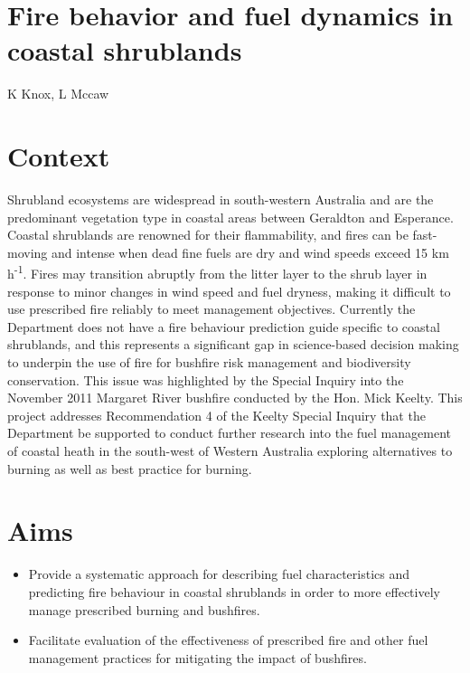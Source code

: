 \documentclass[version=last,
    paper=a4, %
    10pt, %
    usenames,
    dvipsnames,
    oneside, %
    headings=openany, %
    DIV=15 %
]{scrbook}
\begin{document}
\section*{Fire behavior and fuel dynamics in coastal shrublands
}

K Knox, L Mccaw


\section*{Context}
Shrubland ecosystems are widespread in south-western Australia and are
the predominant vegetation type in coastal areas between Geraldton and
Esperance. Coastal shrublands are renowned for their flammability, and
fires can be fast-moving and intense when dead fine fuels are dry and
wind speeds exceed 15 km h\textsuperscript{-1}. Fires may transition
abruptly from the litter layer to the shrub layer in response to minor
changes in wind speed and fuel dryness, making it difficult to use
prescribed fire reliably to meet management objectives. Currently the
Department does not have a fire behaviour prediction guide specific to
coastal shrublands, and this represents a significant gap in
science-based decision making to underpin the use of fire for bushfire
risk management and biodiversity conservation. This issue was
highlighted by the Special Inquiry into the November 2011 Margaret River
bushfire conducted by the Hon. Mick Keelty. This project addresses
Recommendation 4 of the Keelty Special Inquiry that the Department be
supported to conduct further research into the fuel management of
coastal heath in the south-west of Western Australia exploring
alternatives to burning as well as best practice for burning.



\section*{Aims}
\begin{itemize}
\itemsep1pt\parskip0pt
\item
  Provide a systematic approach for describing fuel characteristics and
  predicting fire behaviour in coastal shrublands in order to more
  effectively manage prescribed burning and bushfires.
\item
  Facilitate evaluation of the effectiveness of prescribed fire and
  other fuel management practices for mitigating the impact of
  bushfires.
\end{itemize}
\end{document}
